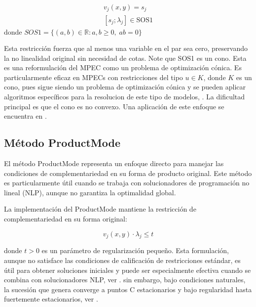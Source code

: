 \begin{equation}\label{eq:SOS1_reform}\begin{matrix}v_j(x,y)=s_j\\
[s_j; \lambda_j] \in \text{SOS1} \end{matrix}
\end{equation}
 donde $SOS1=\{(a,b)\in \mathbb{R}: a,b\geq 0,\; ab=0\}$


Esta restricción fuerza que al menos una variable en el par sea cero, preservando la no linealidad original sin necesidad de cotas. Note que SOS1 es un cono. Esta es una reformulaci\'on del  MPEC como un problema de optimizaci\'on c\'onica. Es particularmente eficaz en MPECs con restricciones del tipo $u\in K$, donde $K$ es un cono, pues sigue siendo un problema de optimizaci\'on c\'onica  y se pueden aplicar algoritmos espec\'ificos para la resolucion de este tipo de modelos, \cite{BilevelJump}. La dificultad principal es que el cono es no convexo. Una aplicaci\'on de este enfoque se encuentra en \cite{SadddiquiNaturalGasSOS1}.


\subsection{Método ProductMode}

El método ProductMode representa un enfoque directo para manejar las condiciones de complementariedad en su forma de producto original. Este método es particularmente útil cuando se trabaja con solucionadores de programación no lineal (NLP), aunque no garantiza la optimalidad global.

La implementación del ProductMode mantiene la restricción de complementariedad en su forma original:

\begin{equation}
    v_j(x,y) \cdot \lambda_j \leq t \label{eq:ProductMode_reg}
\end{equation}

donde $t > 0$ es un parámetro de regularización pequeño. Esta formulación, aunque no satisface las condiciones de calificación de restricciones estándar, es útil para obtener soluciones iniciales y puede ser especialmente efectiva cuando se combina con solucionadores NLP, ver \cite{BilevelJump}. sin embargo, bajo condiciones naturales, la sucesi\'on que genera converge a puntos C  estacionarios y bajo regularidad hasta fuertemente estacionarios, ver \cite{scholtes12}.  



